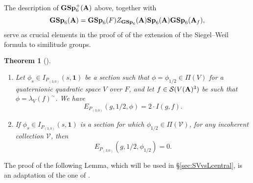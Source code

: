\documentclass[11pt, reqno]{amsart}
\theoremstyle{plain}
\newtheorem{theorem}{Theorem}[section]
\theoremstyle{definition}
\theoremstyle{remark}
\theoremstyle{plain}
\def\A{{\bf A}}
\def\GSp{{\mathbf{GSp}}}
\def\Sp{{\mathbf{Sp}}}
\begin{document}
The description of $\GSp_6^+(\A)$ above, together with
\begin{equation*} \GSp_6(\A) = \GSp_6(F)Z_{\GSp_6}(\A)\Sp_6(\A)\GSp_6(\A_f),\end{equation*}
serve as crucial elements in the proof of \cite{KudlaHarrisJacquet} of the extension of the Siegel--Weil formula to similitude groups.
\begin{theorem}[{\cite[Theorem 4.2]{KudlaHarrisJacquet}}]\label{Siegel-Weilnew}\leavevmode 
\begin{enumerate}
    \item  Let $\phi_s \in I_{P_{(3,0)}}\left(s,\mathbf{1}\right)$ be a section such that $ \phi = \phi_{1/2} \in \Pi(V)$ for a quaternionic quadratic space $V$ over $F$, and let $f \in \mathcal{S}(V(\A)^3)$ be such that $\phi  = \lambda_V(f)^{\sim}$.  We have 
     \[E_{P_{(3,0)}}(g, 1/2,\phi) = 2 \cdot I(g, f).\]
     \item If $\phi_s \in I_{P_{(3,0)}}\left(s,\mathbf{1}\right)$ is a section for which $\phi_{1/2} \in \Pi(\mathcal{V})$, for any incoherent collection $\mathcal{V}$, then 
     \[E_{P_{(3,0)}}(g, 1/2,\phi_{1/2}) = 0.\]
\end{enumerate}
\end{theorem}

The proof of the following Lemma, which will be used in \S \ref{sec:SVvsLcentral}, is an adaptation of the one of \cite[Theorem 4.1(ii)]{Kudla:Integral:Borcherds}. 
\end{document}
